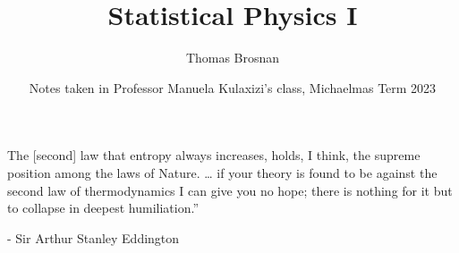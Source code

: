 \documentclass[11pt]{article}
\title{Statistical Physics I}
\author{Thomas Brosnan}
\date{Notes taken in Professor Manuela Kulaxizi's class, Michaelmas Term 2023}
\numberwithin{equation}{section}
\numberwithin{equation}{section}
\begin{document}
\maketitle

\newpage
\vspace*{\fill}
\begin{center}
    \Large 
   The [second] law that entropy always increases, holds, I think, the supreme position among the laws of Nature. … if your theory is found to be against the second law of thermodynamics I can give you no hope; there is nothing for it but to collapse in deepest humiliation.”

- Sir Arthur Stanley Eddington
\end{center}
\vspace*{\fill}
\newpage
\tableofcontents
    
    

\end{document}
